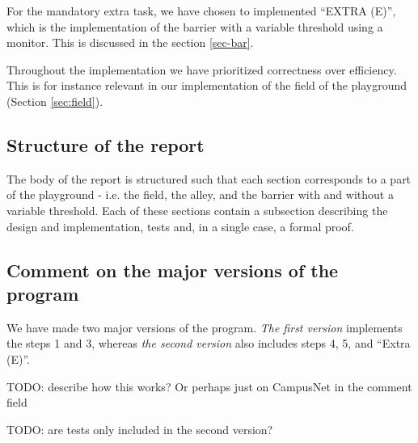 For the mandatory extra task, we have chosen to implemented ``EXTRA (E)'', which is the implementation of the barrier with a variable threshold using a monitor. This is discussed in the section \ref{sec-bar}.

Throughout the implementation we have prioritized correctness over efficiency. This is for instance relevant in our implementation of the field of the playground (Section \ref{sec:field}).



\subsection{Structure of the report}
The body of the report is structured such that each section corresponds to a part of the playground - i.e. the field, the alley, and the barrier with and without a variable threshold. Each of these sections contain a subsection describing the design and implementation, tests and, in a single case, a formal proof.



\subsection{Comment on the major versions of the program}
\label{sub:versions}
We have made two major versions of the program. \emph{The first version} implements the steps 1 and 3, whereas \emph{the second version} also includes steps 4, 5, and ``Extra (E)''.

TODO: describe how this works? Or perhaps just on CampusNet in the comment field

TODO: are tests only included in the second version?